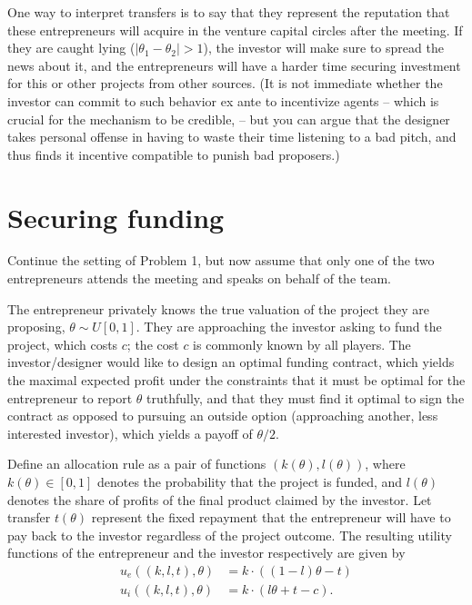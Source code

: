 \documentclass[a4paper]{article}
\begin{document}
\begin{enumerate}
		One way to interpret transfers is to say that they represent the reputation that these entrepreneurs will acquire in the venture capital circles after the meeting. If they are caught lying ($|\theta_1 - \theta_2|>1$), the investor will make sure to spread the news about it, and the entrepreneurs will have a harder time securing investment for this or other projects from other sources. 
		(It is not immediate whether the investor can commit to such behavior ex ante to incentivize agents -- which is crucial for the mechanism to be credible, -- but you can argue that the designer takes personal offense in having to waste their time listening to a bad pitch, and thus finds it incentive compatible to punish bad proposers.)
	\end{enumerate}
\fi



\section{Securing funding}
	
	Continue the setting of Problem 1, but now assume that only one of the two entrepreneurs attends the meeting and speaks on behalf of the team.
	
	The entrepreneur privately knows the true valuation of the project they are proposing, $\theta \sim U[0,1]$. They are approaching the investor asking to fund the project, which costs $c$; the cost $c$ is commonly known by all players. The investor/designer would like to design an optimal funding contract, which yields the maximal expected profit under the constraints that it must be optimal for the entrepreneur to report $\theta$ truthfully, and that they must find it optimal to sign the contract as opposed to pursuing an outside option (approaching another, less interested investor), which yields a payoff of $\theta/2$.
	
	Define an allocation rule as a pair of functions $(k(\theta),l(\theta))$, where $k(\theta) \in [0,1]$ denotes the probability that the project is funded, and $l(\theta)$ denotes the share of profits of the final product claimed by the investor. Let transfer $t(\theta)$ represent the fixed repayment that the entrepreneur will have to pay back to the investor regardless of the project outcome. The resulting utility functions of the entrepreneur and the investor respectively are given by
	\begin{align*}
		u_e((k,l,t),\theta) &= k \cdot ((1-l)\theta - t)
		\\
		u_i((k,l,t),\theta) &= k \cdot (l \theta + t - c).
	\end{align*}
	
\end{document}
